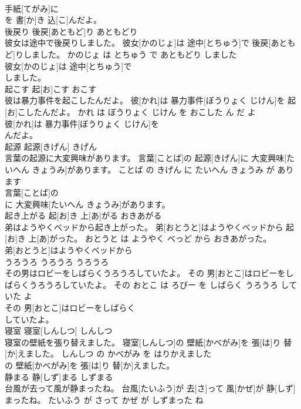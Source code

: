 \documentclass[8pt]{extreport}
\begin{document}
\begin{CJK}{UTF8}{min}
\\	手紙[てがみ]に
\\	を 書[か]き 込[こ]んだよ。			
\\	後戻り	後戻[あともど]り	あともどり	
\\	彼女は途中で後戻りしました。	彼女[かのじょ]は 途中[とちゅう]で 後戻[あともど]りしました。	かのじょ は とちゅう で あともどり しました	
\\	彼女[かのじょ]は 途中[とちゅう]で
\\	しました。			
\\	起こす	起[お]こす	おこす	
\\	彼は暴力事件を起こしたんだよ。	彼[かれ]は 暴力事件[ぼうりょく じけん]を 起[お]こしたんだよ。	かれ は ぼうりょく じけん を おこした ん だ よ	
\\	彼[かれ]は 暴力事件[ぼうりょく じけん]を
\\	んだよ。			
\\	起源	起源[きげん]	きげん	
\\	言葉の起源に大変興味があります。	言葉[ことば]の 起源[きげん]に 大変興味[たいへん きょうみ]があります。	ことば の きげん に たいへん きょうみ が あります	
\\	言葉[ことば]の
\\	に 大変興味[たいへん きょうみ]があります。			
\\	起き上がる	起[お]き 上[あ]がる	おきあがる	
\\	弟はようやくベッドから起き上がった。	弟[おとうと]はようやくベッドから 起[お]き 上[あ]がった。	おとうと は ようやく べっど から おきあがった。	
\\	弟[おとうと]はようやくベッドから
\\	うろうろ	うろうろ	うろうろ	
\\	その男はロビーをしばらくうろうろしていたよ。	その 男[おとこ]はロビーをしばらくうろうろしていたよ。	その おとこ は ろびー を しばらく うろうろ して いた よ	
\\	その 男[おとこ]はロビーをしばらく
\\	していたよ。			
\\	寝室	寝室[しんしつ]	しんしつ	
\\	寝室の壁紙を張り替えました。	寝室[しんしつ]の 壁紙[かべがみ]を 張[は]り 替[か]えました。	しんしつ の かべがみ を はりかえました	
\\	の 壁紙[かべがみ]を 張[は]り 替[か]えました。			
\\	静まる	静[しず]まる	しずまる	
\\	台風が去って風が静まったね。	台風[たいふう]が 去[さ]って 風[かぜ]が 静[しず]まったね。	たいふう が さって かぜ が しずまった ね	

\end{CJK}
\end{document}
